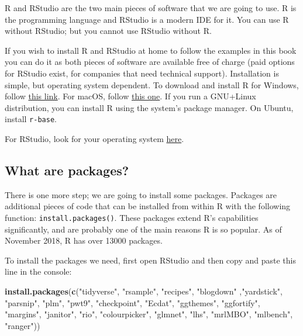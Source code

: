 \documentclass[
]{article}
\newenvironment{Shaded}{\begin{snugshade}}{\end{snugshade}}
\newcommand{\KeywordTok}[1]{\textcolor[rgb]{0.13,0.29,0.53}{\textbf{#1}}}
\newcommand{\NormalTok}[1]{#1}
\newcommand{\StringTok}[1]{\textcolor[rgb]{0.31,0.60,0.02}{#1}}
\begin{document}
R and RStudio are the two main pieces of software that we are going to use. R is the programming
language and RStudio is a modern IDE for it. You can use R without RStudio; but you cannot use
RStudio without R.

If you wish to install R and RStudio at home to follow the examples in this book you can do it as
both pieces of software are available free of charge (paid options for RStudio exist, for companies
that need technical support). Installation is simple, but operating system dependent. To download
and install R for Windows, follow \href{https://cloud.r-project.org/bin/windows/base/}{this link}.
For macOS, follow \href{https://cloud.r-project.org/bin/macosx/}{this one}. If you run a GNU+Linux
distribution, you can install R using the system's package manager. On Ubuntu, install \texttt{r-base}.

For RStudio, look for your operating system \href{https://www.rstudio.com/products/rstudio/download/\#download}{here}.

\hypertarget{what-are-packages}{%
\subsection*{What are packages?}\label{what-are-packages}}

There is one more step; we are going to install some packages. Packages are additional pieces of
code that can be installed from within R with the following function: \texttt{install.packages()}. These
packages extend R's capabilities significantly, and are probably one of the main reasons R is so
popular. As of November 2018, R has over 13000 packages.

To install the packages we need, first open RStudio and then copy and paste this line in the console:

\begin{Shaded}
\begin{Highlighting}[]
\KeywordTok{install.packages}\NormalTok{(}\KeywordTok{c}\NormalTok{(}\StringTok{"tidyverse"}\NormalTok{, }\StringTok{"rsample"}\NormalTok{, }\StringTok{"recipes"}\NormalTok{, }\StringTok{"blogdown"}\NormalTok{ ,}\StringTok{"yardstick"}\NormalTok{, }\StringTok{"parsnip"}\NormalTok{, }\StringTok{"plm"}\NormalTok{, }\StringTok{"pwt9"}\NormalTok{, }
                   \StringTok{"checkpoint"}\NormalTok{, }\StringTok{"Ecdat"}\NormalTok{, }\StringTok{"ggthemes"}\NormalTok{, }\StringTok{"ggfortify"}\NormalTok{, }\StringTok{"margins"}\NormalTok{, }\StringTok{"janitor"}\NormalTok{, }\StringTok{"rio"}\NormalTok{, }
                   \StringTok{"colourpicker"}\NormalTok{, }\StringTok{"glmnet"}\NormalTok{, }\StringTok{"lhs"}\NormalTok{, }\StringTok{"mrlMBO"}\NormalTok{, }\StringTok{"mlbench"}\NormalTok{, }\StringTok{"ranger"}\NormalTok{))}
\end{Highlighting}
\end{Shaded}
\end{document}
